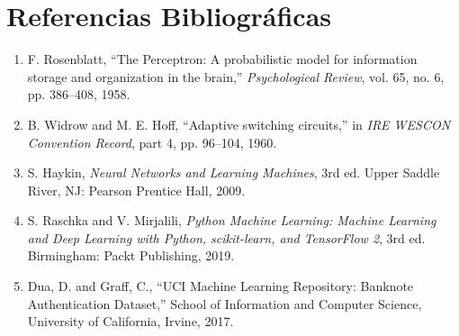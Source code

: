 \documentclass{article}
\begin{document}
\section{Referencias Bibliográficas}
\begin{enumerate}
    \item F. Rosenblatt, ``The Perceptron: A probabilistic model for information storage and organization in the brain,'' \textit{Psychological Review}, vol. 65, no. 6, pp. 386--408, 1958.
    \item B. Widrow and M. E. Hoff, ``Adaptive switching circuits,'' in \textit{IRE WESCON Convention Record}, part 4, pp. 96--104, 1960.
    \item S. Haykin, \textit{Neural Networks and Learning Machines}, 3rd ed. Upper Saddle River, NJ: Pearson Prentice Hall, 2009.
    \item S. Raschka and V. Mirjalili, \textit{Python Machine Learning: Machine Learning and Deep Learning with Python, scikit-learn, and TensorFlow 2}, 3rd ed. Birmingham: Packt Publishing, 2019.
    \item Dua, D. and Graff, C., ``UCI Machine Learning Repository: Banknote Authentication Dataset,'' School of Information and Computer Science, University of California, Irvine, 2017.
\end{enumerate}
\end{document}
